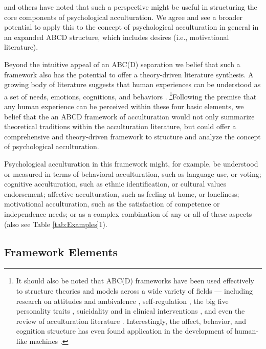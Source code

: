 \documentclass[nobib]{tufte-handout}
\begin{document}
\citet{Sam2006b} and others have noted that such a perspective might be useful in structuring the core components of psychological acculturation. We agree and see a broader potential to apply this to the concept of psychological acculturation in general in an expanded ABCD structure, which includes desires (i.e., motivational literature). 

 Beyond the intuitive appeal of an ABC(D) separation we belief that such a framework also has the potential to offer a theory-driven literature synthesis. A growing body of literature suggests that human experiences can be understood as a set of needs, emotions, cognitions, and behaviors \citep[sometimes referred to as the ABCs or ABCDs of psychology: affect, behavior, cognition, desire; e.g.,][]{Cottam2010, Hogg2005, Jhangiani2014}. \footnote{It should also be noted that ABC(D) frameworks have been used effectively to structure theories and models across a wide variety of fields --- including research on attitudes \citep{Breckler1984} and ambivalence \citep{VanHarreveld2015}, self-regulation \citep{Ben-Eliyahu2015}, the big five personality traits \citep{Wilt2016}, suicidality \citep{Harris2015} and in clinical interventions \citep{Eifert1989}, and even the review of acculturation literature \citep{Ward2001, Ward2019}. Interestingly, the affect, behavior, and cognition structure has even found application in the development of human-like machines \citep{Guo2020}.}Following the premise that any human experience can be perceived within these four basic elements, we belief that the an ABCD framework of acculturation would not only summarize theoretical traditions within the acculturation literature, but could offer a comprehensive and theory-driven framework to structure and analyze the concept of psychological acculturation.

 Psychological acculturation in this framework might, for example, be understood or measured in terms of behavioral acculturation, such as language use, or voting; cognitive acculturation, such as ethnic identification, or cultural values endorsement; affective acculturation, such as feeling at home, or loneliness; motivational acculturation, such as the satisfaction of competence or independence needs; or as a complex combination of any or all of these aspects (also see Table \ref{tab:Examples}1). 



\subsection{Framework Elements}
\end{document}
